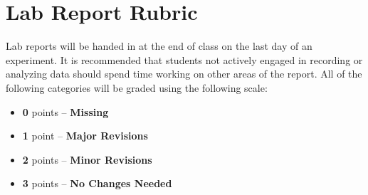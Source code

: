 \section*{Lab Report Rubric}
%

Lab reports will be handed in at the end of class on the last day of an experiment. It is recommended that students not actively engaged in recording or analyzing data should spend time working on other areas of the report. All of the following categories will be graded using the following scale:
\begin{itemize}
\item \textbf{0} points – \textbf{Missing}
\item \textbf{1} point – \textbf{Major Revisions} 
\item \textbf{2} points – \textbf{Minor Revisions} 
\item \textbf{3} points – \textbf{No Changes Needed}
\end{itemize}

